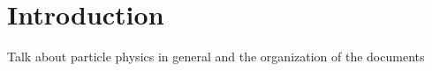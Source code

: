 \chapter{Introduction}\label{ch:intro}

Talk about particle physics in general and the organization of the documents